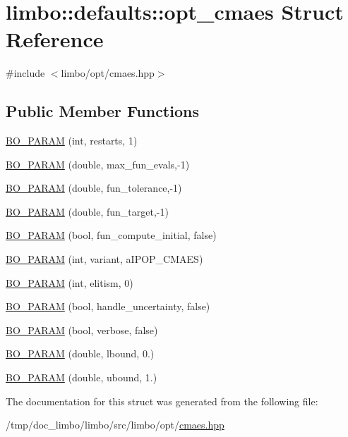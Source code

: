 \hypertarget{structlimbo_1_1defaults_1_1opt__cmaes}{}\section{limbo\+:\+:defaults\+:\+:opt\+\_\+cmaes Struct Reference}
\label{structlimbo_1_1defaults_1_1opt__cmaes}


{\ttfamily \#include $<$limbo/opt/cmaes.\+hpp$>$}

\subsection*{Public Member Functions}
\begin{DoxyCompactItemize}
\item 
\hyperlink{group__opt__defaults_gaba7127b5e591a72095bd6c3a4155828d}{B\+O\+\_\+\+P\+A\+R\+AM} (int, restarts, 1)
\item 
\hyperlink{group__opt__defaults_ga5130bd236acff913c59380059474ebab}{B\+O\+\_\+\+P\+A\+R\+AM} (double, max\+\_\+fun\+\_\+evals,-\/1)
\item 
\hyperlink{group__opt__defaults_ga5f980ba02cafe6ee52d6b9cd485e3d05}{B\+O\+\_\+\+P\+A\+R\+AM} (double, fun\+\_\+tolerance,-\/1)
\item 
\hyperlink{group__opt__defaults_ga1b4276da9161bb04b84b4cd9307a37ab}{B\+O\+\_\+\+P\+A\+R\+AM} (double, fun\+\_\+target,-\/1)
\item 
\hyperlink{group__opt__defaults_ga14aff955e1360233e5ac361bdd2f3118}{B\+O\+\_\+\+P\+A\+R\+AM} (bool, fun\+\_\+compute\+\_\+initial, false)
\item 
\hyperlink{group__opt__defaults_gaf6fe5f409527ed056cee8cf8df52da9e}{B\+O\+\_\+\+P\+A\+R\+AM} (int, variant, a\+I\+P\+O\+P\+\_\+\+C\+M\+A\+ES)
\item 
\hyperlink{group__opt__defaults_ga660850db2d1f35863416f9790fe5125e}{B\+O\+\_\+\+P\+A\+R\+AM} (int, elitism, 0)
\item 
\hyperlink{group__opt__defaults_gad4f97065dd716df6c84e093059ab39f6}{B\+O\+\_\+\+P\+A\+R\+AM} (bool, handle\+\_\+uncertainty, false)
\item 
\hyperlink{group__opt__defaults_gae78e735b53742e438847fb63817f2ed1}{B\+O\+\_\+\+P\+A\+R\+AM} (bool, verbose, false)
\item 
\hyperlink{group__opt__defaults_ga0af64a0a2ea5ba01473e0cf284154dea}{B\+O\+\_\+\+P\+A\+R\+AM} (double, lbound, 0.)
\item 
\hyperlink{group__opt__defaults_ga4d61ad0b07412ab14a72c008a8f99455}{B\+O\+\_\+\+P\+A\+R\+AM} (double, ubound, 1.)
\end{DoxyCompactItemize}


The documentation for this struct was generated from the following file\+:\begin{DoxyCompactItemize}
\item 
/tmp/doc\+\_\+limbo/limbo/src/limbo/opt/\hyperlink{cmaes_8hpp}{cmaes.\+hpp}\end{DoxyCompactItemize}
